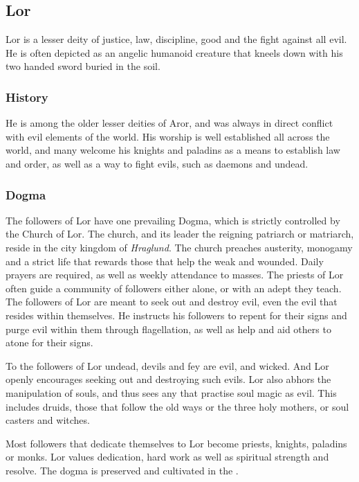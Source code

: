\subsection{Lor}
\label{sec:Lor}

Lor is a lesser deity of justice, law, discipline, good and the fight against
all evil. He is often depicted as an angelic humanoid creature that kneels
down with his two handed sword buried in the soil.

\subsubsection{History}

He is among the older lesser deities of Aror, and was always in direct
conflict with evil elements of the world. His worship is well established
all across the world, and many welcome his knights and paladins as a means
to establish law and order, as well as a way to fight evils, such as
daemons and undead.

\subsubsection{Dogma}

The followers of Lor have one prevailing Dogma, which is strictly controlled
by the Church of Lor. The church, and its leader the reigning patriarch or
matriarch, reside in the city kingdom of \emph{Hraglund}. The church preaches
austerity, monogamy and a strict life that rewards those that help the weak
and wounded. Daily prayers are required, as well as weekly attendance to
masses. The priests of Lor often guide a community of followers either alone,
or with an adept they teach. The followers of Lor are meant to seek out and
destroy evil, even the evil that resides within themselves. He instructs his
followers to repent for their signs and purge evil within them through
flagellation, as well as help and aid others to atone for their signs.

To the followers of Lor undead, devils and fey are evil, and wicked. And Lor
openly encourages seeking out and destroying such evils. Lor also abhors
the manipulation of souls, and thus sees any that practise soul magic as
evil. This includes druids, those that follow the old ways or the three holy
mothers, or soul casters and witches.

Most followers that dedicate themselves to Lor become priests, knights,
paladins or monks. Lor values dedication, hard work as well as spiritual
strength and resolve. The dogma is preserved and cultivated in the
.

